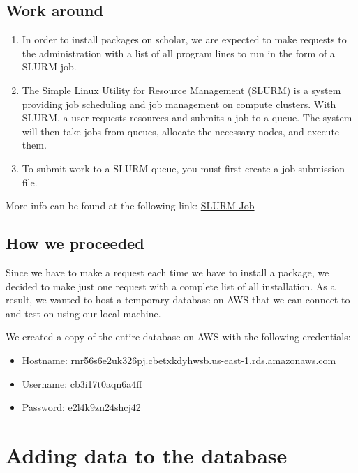 \documentclass[]{book}
\providecommand{\tightlist}{%
  \setlength{\itemsep}{0pt}\setlength{\parskip}{0pt}}
\begin{document}
\subsection{Work around}\label{work-around}

\begin{enumerate}
\def\labelenumi{\arabic{enumi}.}
\item
  In order to install packages on scholar, we are expected to make
  requests to the administration with a list of all program lines to run
  in the form of a SLURM job.
\item
  The Simple Linux Utility for Resource Management (SLURM) is a system
  providing job scheduling and job management on compute clusters. With
  SLURM, a user requests resources and submits a job to a queue. The
  system will then take jobs from queues, allocate the necessary nodes,
  and execute them.
\item
  To submit work to a SLURM queue, you must first create a job
  submission file.
\end{enumerate}

More info can be found at the following link:
\href{https://www.rcac.purdue.edu/knowledge/weber/run/slurm}{SLURM Job}

\subsection{How we proceeded}\label{how-we-proceeded}

Since we have to make a request each time we have to install a package,
we decided to make just one request with a complete list of all
installation. As a result, we wanted to host a temporary database on AWS
that we can connect to and test on using our local machine.

We created a copy of the entire database on AWS with the following
credentials:

\begin{itemize}
\tightlist
\item
  Hostname: rnr56s6e2uk326pj.cbetxkdyhwsb.us-east-1.rds.amazonaws.com
\item
  Username: cb3i17t0aqn6a4ff
\item
  Password: e2l4k9zn24shcj42
\end{itemize}

\section{Adding data to the database}\label{adding-data-to-the-database}
\end{document}
